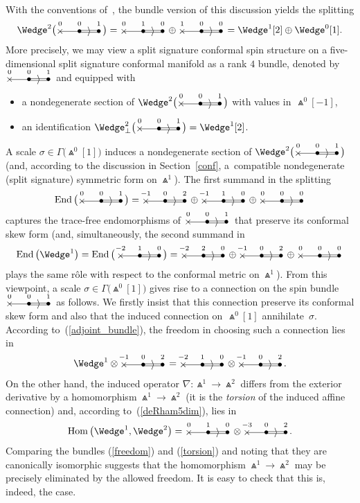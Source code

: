 \documentclass[10pt,a4paper]{amsart}
\numberwithin{equation}{section}
\newcommand{\Hom}{\operatorname{Hom}}
\newcommand{\End}{\operatorname{End}}
\newcommand{\bthree}[3]{\begin{picture}(48,11)
\put(4,1.5){\makebox(0,0){$\times$}}
\put(24,1.5){\makebox(0,0){$\bullet$}}
\put(44,1.5){\makebox(0,0){$\bullet$}}
\put(4,1.5){\line(1,0){20}}
\put(23,2.5){\line(1,0){20}}
\put(23,0.5){\line(1,0){20}}
\put(34,1.5){\makebox(0,0){$\rangle$}}
\put(4,10){\makebox(0,0){$\vphantom{(}\scriptstyle #1$}}
\put(24,10){\makebox(0,0){$\vphantom{(}\scriptstyle #2$}}
\put(44,10){\makebox(0,0){$\vphantom{(}\scriptstyle #3$}}
\end{picture}}
\begin{document}
With the conventions of~\cite{BE}, the bundle version of this discussion yields
the splitting
\[\Wedge^2\big(\bthree{0}{0}{1}\big)=\bthree{0}{1}{0}\oplus\bthree{1}{0}{0}
=\Wedge^1[2]\oplus\Wedge^0[1].\]
More precisely, we may view a split signature conformal spin structure on a
five-dimensional split signature conformal manifold as a rank $4$ bundle,
denoted by $\bthree{0}{0}{1}$ and equipped with
\begin{itemize}\itemsep=0pt
\item a nondegenerate section of $\Wedge^2\big(\bthree{0}{0}{1}\big)$ with values
in~$\Wedge^0[-1]$,
\item an identification
$\Wedge_\perp^2\big(\bthree{0}{0}{1}\big)=\Wedge^1[2]$.
\end{itemize}
A scale $\sigma\in\Gamma\big({\Wedge}^0[1]\big)$ induces a nondegenerate section of
$\Wedge^2\big(\bthree{0}{0}{1}\big)$ (and, according to the discussion in Section~\ref{conf}, a~compatible nondegenerate (split signature) symmetric form on
$\Wedge^1$).
The first summand in the splitting
\begin{equation}\label{adjoint_bundle}
\End\big(\bthree{0}{0}{1}\big)=\bthree{-1}{0}{2}\oplus\bthree{-1}{1}{0}
\oplus\bthree{0}{0}{0}\end{equation}
captures the trace-free endomorphisms of $\bthree{0}{0}{1}$ that preserve its
conformal skew form \big(and, simultaneously, the second summand in
\[\End\big({\Wedge}^1\big)=\End\big(\, \bthree{-2}{1}{0}\big)
=\bthree{-2}{2}{0}\oplus\bthree{-1}{0}{2}\oplus\bthree{0}{0}{0}\]
plays the same r\^ole with respect to the conformal metric on $\Wedge^1$\big).
{From} this viewpoint, a scale $\sigma\in\Gamma\big({\Wedge}^0[1]\big)$ gives rise to a
connection on the spin bundle $\bthree{0}{0}{1}$ as follows. We firstly insist
that this connection preserve its conformal skew form and also that the induced
connection on~$\Wedge^0[1]$ annihilate~$\sigma$. According to~(\ref{adjoint_bundle}), the freedom in choosing such a connection lies in
\begin{equation}\label{freedom}
\Wedge^1\otimes\bthree{-1}{0}{2}
=\bthree{-2}{1}{0}\otimes\bthree{-1}{0}{2}.\end{equation}
On the other hand, the induced operator $\nabla\colon \Wedge^1\to\Wedge^2$ differs
from the exterior derivative by a homomorphism $\Wedge^1\to\Wedge^2$ (it is the
{\em torsion} of the induced affine connection) and, according
to~(\ref{deRham5dim}), lies in
\begin{equation}\label{torsion}
\Hom\big({\Wedge}^1,\Wedge^2\big)=\bthree{0}{1}{0}\otimes\bthree{-3}{0}{2}.
\end{equation}
Comparing the bundles (\ref{freedom}) and (\ref{torsion}) and noting that they
are canonically isomorphic suggests that the homomorphism $\Wedge^1\to\Wedge^2$
may be precisely eliminated by the allowed freedom. It is easy to check that
this is, indeed, the case.
\end{document}
